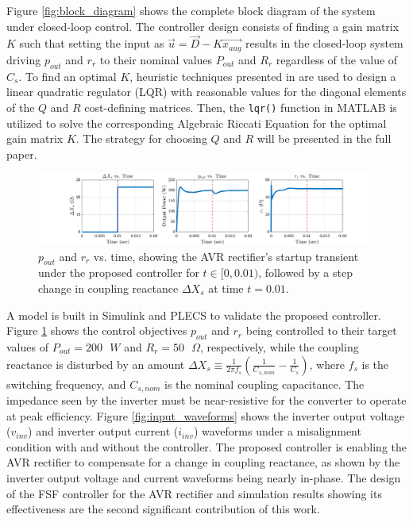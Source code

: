 \documentclass[journal, onecolumn, final, letterpaper, 11pt]{IEEEtran}
\begin{document}
Figure \ref{fig:block_diagram} shows the complete block diagram of the system under closed-loop control. The controller design consists of finding a gain matrix $K$ such that setting the input as $\vec{u} = \vec{D} - K\overrightarrow{x_{aug}}$ results in the closed-loop system driving $p_{out}$ and $r_r$ to their nominal values $P_{out}$ and $R_r$ regardless of the value of $C_s$. To find an optimal $K$, heuristic techniques presented in \cite{2007_Williams} are used to design a linear quadratic regulator (LQR) with reasonable values for the diagonal elements of the $Q$ and $R$ cost-defining matrices. Then, the \texttt{lqr()} function in MATLAB is utilized to solve the corresponding Algebraic Riccati Equation for the optimal gain matrix $K$. The strategy for choosing $Q$ and $R$ will be presented in the full paper.

\begin{figure}[!b]
	\vspace{-0.2cm}
	\centering
	\includegraphics[width=\textwidth]{figures/pout_zin_with_disturbance.png}
	\caption{$p_{out}$ and $r_r$ vs. time, showing the AVR rectifier's startup transient under the proposed controller for $t \in [0, 0.01)$, followed by a step change in coupling reactance $\Delta X_s$ at time $t = 0.01$.}
	\label{fig:step_response}
\end{figure}

A model is built in Simulink and PLECS to validate the proposed controller. Figure \ref{fig:step_response} shows the control objectives $p_{out}$ and $r_r$ being controlled to their target values of $P_{out} = 200 \texttt{ }W$ and $R_r = 50 \texttt{ }\Omega$, respectively, while the coupling reactance is disturbed by an amount $\Delta X_s \equiv \frac{1}{2 \pi f_s}(\frac{1}{C_{s,nom}} - \frac{1}{C_s})$, where $f_s$ is the switching frequency, and $C_{s,nom}$ is the nominal coupling capacitance. The impedance seen by the inverter must be near-resistive for the converter to operate at peak efficiency. Figure \ref{fig:input_waveforms} shows the inverter output voltage ($v_{inv}$) and inverter output current ($i_{inv}$) waveforms under a misalignment condition with and without the controller. The proposed controller is enabling the AVR rectifier to compensate for a change in coupling reactance, as shown by the inverter output voltage and current waveforms being nearly in-phase. The design of the FSF controller for the AVR rectifier and simulation results showing its effectiveness are the second significant contribution of this work.
\end{document}
